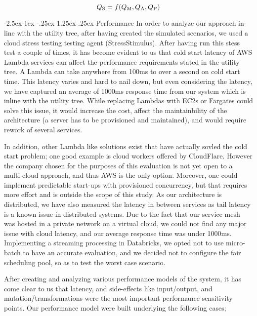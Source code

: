 \documentclass[review]{elsarticle}
\makeatletter
\renewcommand\paragraph{\@startsection{paragraph}{4}{\z@}%
            {-2.5ex\@plus -1ex \@minus -.25ex}%
            {1.25ex \@plus .25ex}%
            {\normalfont\normalsize\itshape}}
\makeatother
\begin{document}
\begin{equation}
    Q\textsubscript{S} = f(Q\textsubscript{M}, Q\textsubscript{A}, Q\textsubscript{P})
\end{equation}

\paragraph{Performance} In order to analyze our approach in-line with the utility tree, after having created the simulated scenarios, we used a cloud stress testing testing agent (StressStimulus). After having run this stess test a couple of times, it has become evident to us that cold start latency of AWS Lambda services can affect the performance requirements stated in the utility tree. A Lambda can take anywhere from 100ms to over a second on cold start time. This latency varies and hard to nail down, but even considering the latency, we have captured an average of 1000ms response time from our system which is inline with the utility tree. While replacing Lambdas with EC2s or Fargates could solve this issue, it would increase the cost, affect the maintainbility of the architecture (a server has to be provisioned and maintained), and would require rework of several services.

In addition, other Lambda like solutions exist that have actually sovled the cold start problem; one good example is cloud workers offered by CloudFlare. However the company chosen for the purposes of this evaluation is not yet open to a multi-cloud approach, and thus AWS is the only option. Moreover, one could implement predictable start-ups with provisioned concurrency, but that requires more effort and is outside the scope of this study. As our architecture is distributed, we have also measured the latency in between services as tail latency is a known issue in distributed systems. Due to the fact that our service mesh was hosted in a private network on a virtual cloud, we could not find any major issue with cloud latency, and our average response time was under 1000ms. Implementing a streaming processing in Databricks, we opted not to use micro-batch to have an accurate evaluation, and we decided not to configure the fair scheduling pool, so as to test the worst case scenario.

After creating and analyzing various performance models of the system, it has come clear to us that latency, and side-effects like input/output, and mutation/transformations were the most important performance sensitivity points. Our performance model were built underlying the following cases;
\end{document}
